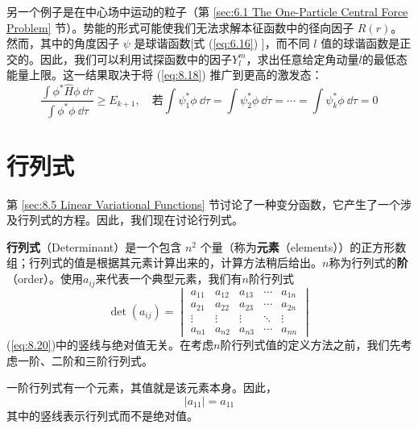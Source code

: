     另一个例子是在中心场中运动的粒子（第 \ref{sec:6.1 The One-Particle Central Force Problem} 节）。势能的形式可能使我们无法求解本征函数中的径向因子 $R(r)$。然而，其中的角度因子 $\psi$ 是球谐函数[式 (\ref{eq:6.16}) ]，而不同 $l$ 值的球谐函数是正交的。因此，我们可以利用试探函数中的因子$Y_l^m$，求出任意给定角动量$l$的最低态能量上限。这一结果取决于将 (\ref{eq:8.18}) 推广到更高的激发态：
    \begin{equation}
        \frac{\int \phi^{\ast} \hat{H}\phi \:\dd \tau}{\int \phi^{\ast} \phi \:\dd \tau} \geq E_{k+1}, \quad \text{若} \int \psi_1^{\ast} \phi \: \dd \tau = \int \psi_2^{\ast} \phi \:\dd \tau = \cdots = \int \psi_k^{\ast} \phi \:\dd \tau = 0
        \label{eq:8.19}
    \end{equation}

\section{行列式}
\label{sec:8.3 Determinants}
    第 \ref{sec:8.5 Linear Variational Functions} 节讨论了一种变分函数，它产生了一个涉及行列式的方程。因此，我们现在讨论行列式。
     
    \textbf{行列式}（Determinant）是一个包含 $n^2$ 个量（称为\textbf{元素}（elements））的正方形数组；行列式的值是根据其元素计算出来的，计算方法稍后给出。$n$称为行列式的\textbf{阶}（order）。使用$a_{ij}$来代表一个典型元素，我们有$n$阶行列式
    \begin{equation}
            \det\left(a_{ij}\right) = \begin{vmatrix}
                a_{11} & a_{12} & a_{13} & \cdots & a_{1n} \\
                a_{21} & a_{22} & a_{23} & \cdots & a_{2n} \\
                \vdots & \vdots & \vdots & \ddots & \vdots \\
                a_{n1} & a_{n2} & a_{n3} & \cdots & a_{nn}
            \end{vmatrix}
            \label{eq:8.20}
    \end{equation}
    (\ref{eq:8.20})中的竖线与绝对值无关。在考虑$n$阶行列式值的定义方法之前，我们先考虑一阶、二阶和三阶行列式。

    一阶行列式有一个元素，其值就是该元素本身。因此，
    \begin{equation}
        \left| a_{11} \right| = a_{11}
        \label{eq:8.21}
    \end{equation}
    其中的竖线表示行列式而不是绝对值。

